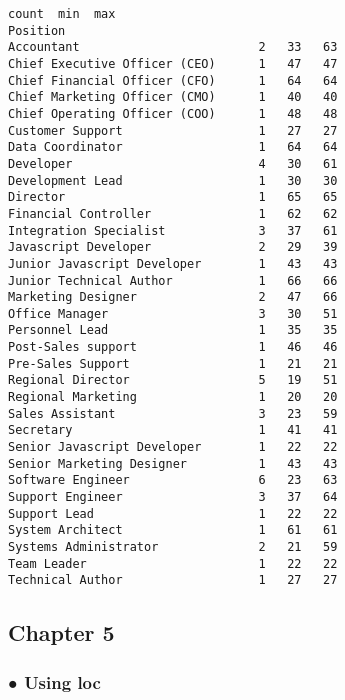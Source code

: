 \documentclass[11pt]{article}
\makeatletter
\newcommand{\boxspacing}{\kern\kvtcb@left@rule\kern\kvtcb@boxsep}
\newcommand{\prompt}[4]{
        {\ttfamily\llap{{\color{#2}[#3]:\hspace{3pt}#4}}\vspace{-\baselineskip}}
    }
\makeatother
\begin{document}
            \begin{tcolorbox}[breakable, size=fbox, boxrule=.5pt, pad at break*=1mm, opacityfill=0]
\prompt{Out}{outcolor}{35}{\boxspacing}
\begin{Verbatim}[commandchars=\\\{\}]
                               count  min  max
Position
Accountant                         2   33   63
Chief Executive Officer (CEO)      1   47   47
Chief Financial Officer (CFO)      1   64   64
Chief Marketing Officer (CMO)      1   40   40
Chief Operating Officer (COO)      1   48   48
Customer Support                   1   27   27
Data Coordinator                   1   64   64
Developer                          4   30   61
Development Lead                   1   30   30
Director                           1   65   65
Financial Controller               1   62   62
Integration Specialist             3   37   61
Javascript Developer               2   29   39
Junior Javascript Developer        1   43   43
Junior Technical Author            1   66   66
Marketing Designer                 2   47   66
Office Manager                     3   30   51
Personnel Lead                     1   35   35
Post-Sales support                 1   46   46
Pre-Sales Support                  1   21   21
Regional Director                  5   19   51
Regional Marketing                 1   20   20
Sales Assistant                    3   23   59
Secretary                          1   41   41
Senior Javascript Developer        1   22   22
Senior Marketing Designer          1   43   43
Software Engineer                  6   23   63
Support Engineer                   3   37   64
Support Lead                       1   22   22
System Architect                   1   61   61
Systems Administrator              2   21   59
Team Leader                        1   22   22
Technical Author                   1   27   27
\end{Verbatim}
\end{tcolorbox}
        
    \hypertarget{chapter-5}{%
\subsection{Chapter 5}\label{chapter-5}}

    \hypertarget{using-loc}{%
\subsubsection{● Using loc}\label{using-loc}}
\end{document}
